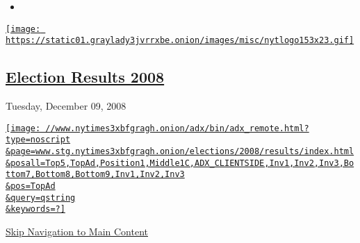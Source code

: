 \begin{itemize}
\item
\end{itemize}

\href{//www.nytimes3xbfgragh.onion}{\texttt{[image: https://static01.graylady3jvrrxbe.onion/images/misc/nytlogo153x23.gif]}}

\hypertarget{election-results-2008}{%
\subsection{\texorpdfstring{\href{../president/votes.html}{Election
Results 2008}}{Election Results 2008}}\label{election-results-2008}}

Tuesday, December 09, 2008

\href{//www.nytimes3xbfgragh.onion/adx/bin/adx_click.html?type=cookie\&pos=TopAd}{\texttt{[image: //www.nytimes3xbfgragh.onion/adx/bin/adx\_remote.html?type=noscript\\\&page=www.stg.nytimes3xbfgragh.onion/elections/2008/results/index.html\\\&posall=Top5,TopAd,Position1,Middle1C,ADX\_CLIENTSIDE,Inv1,Inv2,Inv3,Bottom7,Bottom8,Bottom9,Inv1,Inv2,Inv3\\\&pos=TopAd\\\&query=qstring\\\&keywords=?]}}

\protect\hyperlink{nytint-anchor-mainContent}{Skip Navigation to Main
Content}

